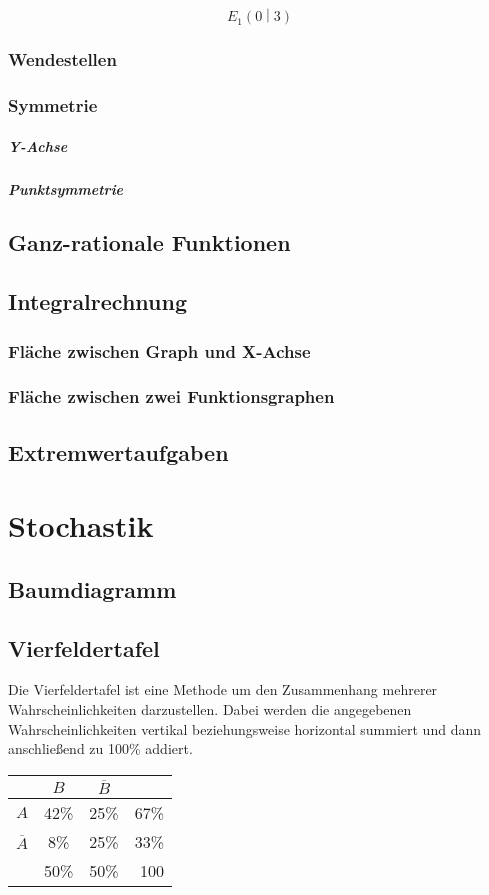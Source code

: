 \documentclass[a4paper]{article}
\begin{document}
				\begin{equation}
					E_1\left(0\middle|3\right)
				\end{equation}
				
			\subsubsection{Wendestellen}
			\subsubsection{Symmetrie}
				\subparagraph{Y-Achse}
				\subparagraph{Punktsymmetrie}
		\subsection{Ganz-rationale Funktionen}
		\subsection{Integralrechnung}
			\subsubsection{Fläche zwischen Graph und X-Achse}
			\subsubsection{Fläche zwischen zwei Funktionsgraphen}
		\subsection{Extremwertaufgaben}

	\section{Stochastik}
		\subsection{Baumdiagramm}
		\subsection{Vierfeldertafel}
			Die Vierfeldertafel ist eine Methode um den Zusammenhang mehrerer Wahrscheinlichkeiten darzustellen. Dabei werden die angegebenen Wahrscheinlichkeiten vertikal beziehungsweise horizontal summiert und dann anschließend zu 100\% addiert.
			
			\setlength{\tabcolsep}{10pt}
			\renewcommand{\arraystretch}{1.5}
			\begin{center}
				\begin{tabular}{ l | c | c | r }
									& $B$ 	& $\overline{B}$ 	& 		\\ \hline
					$A$ 			& 42\% 	& 25\% 				& 67\%	\\ \hline
					$\overline{A}$ 	& 8\% 	& 25\%				& 33\% 	\\ \hline
					& 50\% 	& 50\% 				& 100
				\end{tabular}
			\end{center}
\end{document}
